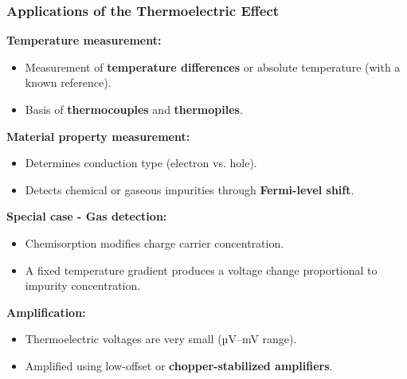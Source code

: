 \begin{frame}
	\frametitle{Applications of the Thermoelectric Effect}
    \small
    \textbf{Temperature measurement:}
    \begin{itemize}
        \item Measurement of \textbf{temperature differences} or absolute temperature (with a known reference).
        \item Basis of \textbf{thermocouples} and \textbf{thermopiles}.
    \end{itemize}
    \textbf{Material property measurement:}
    \begin{itemize}
        \item Determines conduction type (electron vs. hole).
        \item Detects chemical or gaseous impurities through \textbf{Fermi-level shift}.
    \end{itemize}
    \textbf{Special case - Gas detection:}
    \begin{itemize}
        \item Chemisorption modifies charge carrier concentration.
        \item A fixed temperature gradient produces a voltage change proportional to impurity concentration.
    \end{itemize}
    \textbf{Amplification:}
    \begin{itemize}
        \item Thermoelectric voltages are very small (µV–mV range).
        \item Amplified using low-offset or \textbf{chopper-stabilized amplifiers}.
    \end{itemize}
\end{frame}

